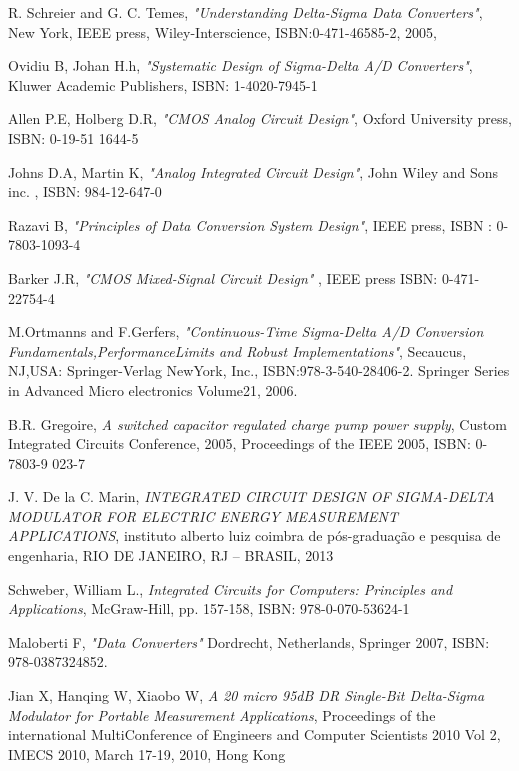 


\begin{thebibliography}{9}

R. Schreier and G. C. Temes,
\textit{"Understanding Delta-Sigma Data Converters"},
New York,
IEEE press,
Wiley-Interscience,
ISBN:0-471-46585-2,
2005,

Ovidiu B, Johan H.h, 
\textit{"Systematic Design of Sigma-Delta A/D Converters"},
Kluwer Academic Publishers,
ISBN: 1-4020-7945-1

Allen P.E,  Holberg D.R, 
\textit{"CMOS Analog Circuit Design"},
Oxford University press,
ISBN: 0-19-51 1644-5

Johns D.A, Martin K, 
\textit{"Analog Integrated Circuit Design"},
John Wiley and Sons inc. ,
ISBN: 984-12-647-0

Razavi B, 
\textit{"Principles of Data Conversion System Design"}, 
IEEE press,
ISBN : 0-7803-1093-4

Barker J.R,
\textit{"CMOS Mixed-Signal Circuit Design" },
IEEE press
ISBN: 0-471-22754-4

M.Ortmanns and F.Gerfers,
\textit{"Continuous-Time Sigma-Delta A/D Conversion
Fundamentals,PerformanceLimits and Robust Implementations"},
Secaucus,
NJ,USA:
Springer-Verlag
NewYork,
Inc.,
ISBN:978-3-540-28406-2.
Springer Series in Advanced Micro electronics
Volume21,
2006.

B.R. Gregoire,
\textit{A switched capacitor regulated charge pump power supply},
Custom Integrated Circuits Conference, 2005, Proceedings of the IEEE 2005,
ISBN: 0-7803-9 023-7

J. V. De la C. Marin,
\textit{INTEGRATED CIRCUIT DESIGN OF SIGMA-DELTA MODULATOR FOR
ELECTRIC ENERGY MEASUREMENT APPLICATIONS},
instituto alberto luiz coimbra de pós-graduação e pesquisa de engenharia,
RIO DE JANEIRO, RJ – BRASIL,
2013

Schweber, William L.,
\textit{Integrated Circuits for Computers: Principles and Applications},
McGraw-Hill, pp. 157-158,
ISBN: 978-0-070-53624-1

Maloberti F, 
\textit{"Data Converters"}
Dordrecht, Netherlands,
Springer 2007,
ISBN: 978-0387324852.

Jian X, Hanqing W, Xiaobo W,
\textit{A 20 micro 95dB DR Single-Bit Delta-Sigma Modulator for Portable Measurement Applications},
Proceedings of the international MultiConference of Engineers and Computer Scientists 2010 Vol 2,
IMECS 2010, March 17-19, 2010, Hong Kong


\end{thebibliography}
